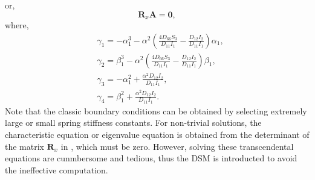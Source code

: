 \documentclass[preprint,12pt]{elsarticle}
\begin{document}
%
or,
%
\begin{equation}\label{eq:ABx1}
		\mathbf{R}_x \mathbf{A} = \mathbf{0},
\end{equation}
%
where,
%
\begin{equation}\label{eq:gamma}
	\begin{split}
		&\gamma_1 = -\alpha_1^3 - \alpha^2 \left( \frac{4D_{66}S_3}{D_{11}I_1} - \frac{D_{12}I_2}{D_{11}I_1} \right) \alpha_1, \\
		&\gamma_2 = \beta_1^3 - \alpha^2 \left( \frac{4D_{66}S_3}{D_{11}I_1} - \frac{D_{12}I_2}{D_{11}I_1} \right) \beta_1, \\
		&\gamma_3 = -\alpha_1^2 + \frac{\alpha^2 D_{12} I_2}{D_{11} I_1}, \\
		&\gamma_4 = \beta_1^2 + \frac{\alpha^2 D_{12} I_2}{D_{11} I_1}.
	\end{split}
\end{equation}
%
Note that the classic boundary conditions can be obtained by selecting extremely large or small spring stiffness constants.
For non-trivial solutions, the characteristic equation or eigenvalue equation is obtained from the determinant of the matrix $\mathbf{R}_x$ in , which must be zero.
However, solving these transcendental equations are cunmbersome and tedious, thus the DSM is introducted to avoid the ineffective computation.
\end{document}

